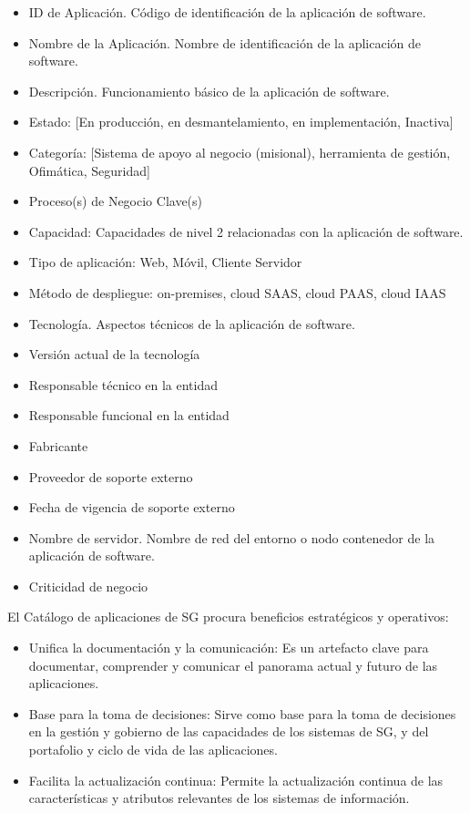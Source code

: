 \documentclass[
	a4paper, %
	12pt, %
]{include/CSSullivanBusinessReport}
\def\tightlist{}
\begin{document}
\begin{itemize}
\tightlist
\item
  ID de Aplicación. Código de identificación de la aplicación de
  software.
\item
  Nombre de la Aplicación. Nombre de identificación de la aplicación de
  software.
\item
  Descripción. Funcionamiento básico de la aplicación de software.
\item
  Estado: {[}En producción, en desmantelamiento, en implementación,
  Inactiva{]}
\item
  Categoría: {[}Sistema de apoyo al negocio (misional), herramienta de
  gestión, Ofimática, Seguridad{]}
\item
  Proceso(s) de Negocio Clave(s)
\item
  Capacidad: Capacidades de nivel 2 relacionadas con la aplicación de
  software.
\item
  Tipo de aplicación: Web, Móvil, Cliente Servidor
\item
  Método de despliegue: on-premises, cloud SAAS, cloud PAAS, cloud IAAS
\item
  Tecnología. Aspectos técnicos de la aplicación de software.
\item
  Versión actual de la tecnología
\item
  Responsable técnico en la entidad
\item
  Responsable funcional en la entidad
\item
  Fabricante
\item
  Proveedor de soporte externo
\item
  Fecha de vigencia de soporte externo
\item
  Nombre de servidor. Nombre de red del entorno o nodo contenedor de la
  aplicación de software.
\item
  Criticidad de negocio
\end{itemize}

El Catálogo de aplicaciones de SG procura beneficios estratégicos y
operativos:

\begin{itemize}
\tightlist
\item
  Unifica la documentación y la comunicación: Es un artefacto clave para
  documentar, comprender y comunicar el panorama actual y futuro de las
  aplicaciones.
\item
  Base para la toma de decisiones: Sirve como base para la toma de
  decisiones en la gestión y gobierno de las capacidades de los sistemas
  de SG, y del portafolio y ciclo de vida de las aplicaciones.
\item
  Facilita la actualización continua: Permite la actualización continua
  de las características y atributos relevantes de los sistemas de
  información.
\end{itemize}
\end{document}
